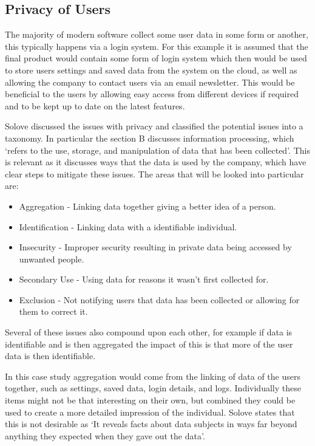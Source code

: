 \documentclass[a4paper]{article}
\begin{document}
\subsection{Privacy of Users}
The majority of modern software collect some user data in some form or another, this typically happens via a login system.
For this example it is assumed that the final product would contain some form of login system which then would be used to store users settings and saved data from the system on the cloud, as well as allowing the company to contact users via an email newsletter.
This would be beneficial to the users by allowing easy access from different devices if required and to be kept up to date on the latest features.
\\ \par
Solove discussed the issues with privacy and classified the potential issues into a taxonomy.
In particular the section B discusses information processing, which `refers to the use, storage, and manipulation of data that has been collected'\cite{soloveTaxonomy}.
This is relevant as it discusses ways that the data is used by the company, which have clear steps to mitigate these issues.
The areas that will be looked into particular are:
\begin{itemize}
    \item Aggregation - Linking data together giving a better idea of a person.
    \item Identification - Linking data with a identifiable individual.
    \item Insecurity - Improper security resulting in private data being accessed by unwanted people.
    \item Secondary Use - Using data for reasons it wasn't first collected for.
    \item Exclusion - Not notifying users that data has been collected or allowing for them to correct it.
\end{itemize}
Several of these issues also compound upon each other, for example if data is identifiable and is then aggregated the impact of this is that more of the user data is then identifiable.
\par
In this case study aggregation would come from the linking of data of the users together, such as settings, saved data, login details, and logs.
Individually these items might not be that interesting on their own, but combined they could be used to create a more detailed impression of the individual.
Solove states that this is not desirable as `It reveals facts about data subjects in ways far beyond anything they expected when they gave out the data'\cite{soloveTaxonomy}.
\end{document}
